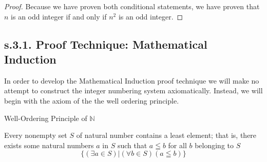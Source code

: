 \begin{example}
\begin{proof}
    Because we have proven both conditional statements, we have proven that $n$ is an odd integer if and only if $n^2$ is an odd integer.
\end{proof}
\end{example}


\newpage
\subsection{s.3.1. Proof Technique: Mathematical Induction}

In order to develop the Mathematical Induction proof technique we will make no attempt to construct the integer numbering system axiomatically. Instead, we will begin with the axiom of the the well ordering principle. 

\begin{definition}
Well-Ordering Principle of $\mathbb{N}$ \\

\begin{tcolorbox}
    Every nonempty set $S$ of natural number contains a least element; that is, there exists some natural numbers $a$ in $S$ such that $a \leqq b$ for all $b$ belonging to $S$
        \begin{equation*}
            \{ (\exists a \in S) | (\forall b \in S)(a \leqq b) \}
        \end{equation*}
\end{tcolorbox}
\end{definition}


